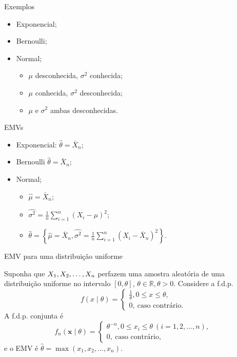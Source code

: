 \begin{frame}{Exemplos}
 \begin{itemize}
  \item Exponencial;
  \item Bernoulli;
  \item Normal;
  \begin{itemize}
   \item $\mu$ desconhecida, $\sigma^2$ conhecida;
   \item $\mu$ conhecida, $\sigma^2$ desconhecida;
   \item $\mu$ e $\sigma^2$ ambas desconhecidas.
  \end{itemize}
 \end{itemize}
\end{frame}

\begin{frame}{EMVs}
 \begin{itemize}
  \item Exponencial: $\hat{\theta} = \bar{X}_n$;
  \item Bernoulli $\hat{\theta} = \bar{X}_n$;
  \item Normal;
  \begin{itemize}
   \item $\hat{\mu} = \bar{X}_n$;
   \item $\hat{\sigma^2} = \frac{1}{n}\sum_{i=1}^n (X_i - \mu)^2$;
   \item $\hat{\theta} = \left\{ \hat{\mu} = \bar{X}_n,  \hat{\sigma^2} = \frac{1}{n}\sum_{i=1}^n (X_i - \bar{X}_n)^2 \right\}$.
  \end{itemize}
 \end{itemize}
\end{frame}

\begin{frame}{EMV para uma distribuição uniforme}

\begin{exemplo}
\label{ex:uniform_closed}
 Suponha que $X_1, X_2, \ldots, X_n$ perfazem uma amostra aleatória de uma distribuição uniforme no intervalo $[0, \theta]$, $\theta \in \mathbb{R}, \theta > 0$.
 Considere a f.d.p.
 \begin{equation}
  \label{eq:uniform_closed}
  f(x\mid \theta)=
 \begin{cases}
     \frac{1}{\theta}, 0 \leq x \leq \theta,\\
     0,\:\text{caso contrário}.
\end{cases}
  \end{equation}
A f.d.p. conjunta é
\begin{equation}
 \label{eq:uniform_closed_joint}
   f_n(\boldsymbol{x} \mid \theta)=
 \begin{cases}
     \theta^{-n}, 0 \leq x_i \leq \theta \: (i = 1, 2, \ldots, n),\\
     0,\:\text{caso contrário},
\end{cases}
\end{equation}
e o EMV é $\hat{\theta} = \max(x_1, x_2, \ldots, x_n)$.
\end{exemplo}
\end{frame}

